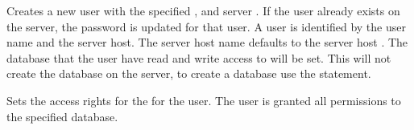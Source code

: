 Creates a new user with the specified ,  and server .
If the user already exists on the server, the password is updated for that user.
A user is identified by the user name and the server host.
The server host name defaults to the server host .
The database that the user have read and write access to will be set. This will not create
the database on the server, to create a database use the  statement.


Sets the access rights for the  for the user. The user is granted 
all permissions to the specified database.
